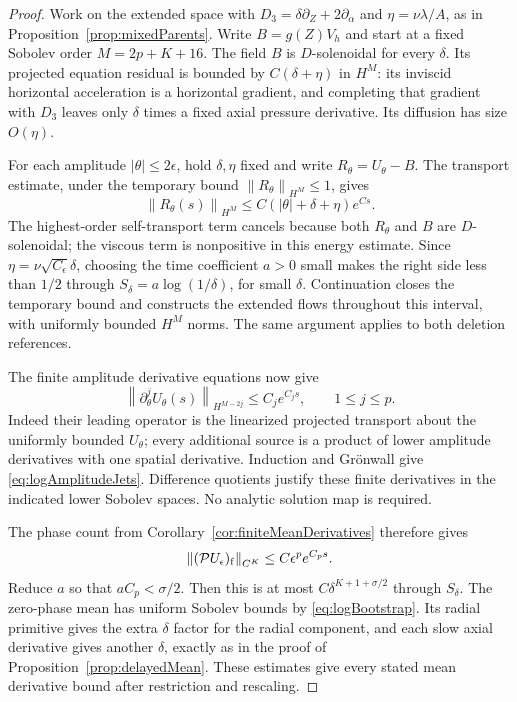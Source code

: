 \documentclass[11pt]{article}
\theoremstyle{remark}
\newcommand{\PP}{\mathcal P}
\newcommand{\norm}[1]{\left\lVert#1\right\rVert}
\begin{document}
\begin{proof}
Work on the extended space with
$D_3=\delta\partial_Z+2\partial_\alpha$ and
$\eta=\nu\lambda/A$, as in Proposition~\ref{prop:mixedParents}.
Write $B=g(Z)V_h$ and start at a fixed Sobolev order
$M=2p+K+16$. The field $B$ is $D$-solenoidal for every $\delta$.
Its projected equation residual is bounded by $C(\delta+\eta)$
in $H^M$: its inviscid horizontal acceleration is a horizontal
gradient, and completing that gradient with $D_3$ leaves only
$\delta$ times a fixed axial pressure derivative. Its diffusion
has size $O(\eta)$.

For each amplitude $|\theta|\leq2\epsilon$, hold $\delta,\eta$
fixed and write $R_\theta=U_\theta-B$. The transport estimate, under
the temporary bound $\norm{R_\theta}_{H^M}\leq1$, gives
\begin{equation}\label{eq:logBootstrap}
 \norm{R_\theta(s)}_{H^M}
        \leq C(|\theta|+\delta+\eta)e^{Cs}.
\end{equation}
The highest-order self-transport term cancels because both $R_\theta$
and $B$ are $D$-solenoidal; the viscous term is nonpositive in this
energy estimate. Since $\eta=\nu\sqrt{C_\epsilon}\delta$, choosing
the time coefficient $a>0$ small makes the right side less than
$1/2$ through $S_\delta=a\log(1/\delta)$, for small $\delta$.
Continuation closes the temporary bound and constructs the extended
flows throughout this interval, with uniformly bounded $H^M$ norms.
The same argument applies to both deletion references.

The finite amplitude derivative equations now give
\begin{equation}\label{eq:logAmplitudeJets}
 \norm{\partial_\theta^j U_\theta(s)}_{H^{M-2j}}
      \leq C_j e^{C_js},\qquad 1\leq j\leq p.
\end{equation}
Indeed their leading operator is the linearized projected transport
about the uniformly bounded $U_\theta$; every additional source is a
product of lower amplitude derivatives with one spatial derivative.
Induction and Gr\"onwall give \eqref{eq:logAmplitudeJets}. Difference
quotients justify these finite derivatives in the indicated lower
Sobolev spaces. No analytic solution map is required.

The phase count from Corollary~\ref{cor:finiteMeanDerivatives} therefore
gives
\[
 \norm{(\PP U_\epsilon)_{\rm f}}_{C^K}
        \leq C\epsilon^p e^{C_ps}.
\]
Reduce $a$ so that $aC_p<\sigma/2$. Then this is at most
$C\delta^{K+1+\sigma/2}$ through $S_\delta$.
The zero-phase mean has uniform Sobolev bounds by
\eqref{eq:logBootstrap}. Its radial primitive gives the extra
$\delta$ factor for the radial component, and each slow axial
derivative gives another $\delta$, exactly as in the proof of
Proposition~\ref{prop:delayedMean}. These estimates give every stated
mean derivative bound after restriction and rescaling.


\end{proof}
\end{document}
